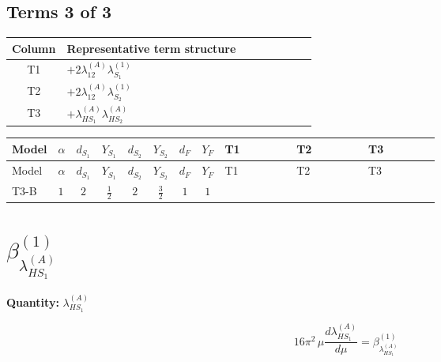 \documentclass[8pt]{article}
\begin{document}
\begin{landscape}
\subsection*{Terms 3 of 3}
\begin{center}
\begin{tabular}{@{}c >{\raggedright\arraybackslash}p{0.82\linewidth}@{}}
\toprule
Column & Representative term structure \\
\midrule
T1 & \(\displaystyle +2 {\lambda_{12}^{(A)}} {\lambda_{S_1}^{(1)}}\) \\
\midrule
T2 & \(\displaystyle +2 {\lambda_{12}^{(A)}} {\lambda_{S_2}^{(1)}}\) \\
\midrule
T3 & \(\displaystyle +{\lambda_{HS_1}^{(A)}} {\lambda_{HS_2}^{(A)}}\) \\
\midrule
\bottomrule
\end{tabular}
\end{center}
\smallskip
\tiny
\begin{longtable}{@{}llcccccc >{\raggedright\arraybackslash}p{0.21\linewidth} >{\raggedright\arraybackslash}p{0.21\linewidth} >{\raggedright\arraybackslash}p{0.21\linewidth}@{}}
\toprule
Model & $\alpha$ & $d_{S_1}$ & $Y_{S_1}$ & $d_{S_2}$ & $Y_{S_2}$ & $d_F$ & $Y_F$ & T1 & T2 & T3 \\
\midrule
\endfirsthead
\toprule
Model & $\alpha$ & $d_{S_1}$ & $Y_{S_1}$ & $d_{S_2}$ & $Y_{S_2}$ & $d_F$ & $Y_F$ & T1 & T2 & T3 \\
\midrule
\endhead
T3-B & $1$ & $2$ & $\frac{1}{2}$ & $2$ & $\frac{3}{2}$ & $1$ & $1$ & \scriptsize\adjustbox{max width=\linewidth}{$\begin{gathered} +2 {\lambda_{12}^{(A)}} {\lambda_{S_1}^{(1)}}\end{gathered}$} & \scriptsize\adjustbox{max width=\linewidth}{$\begin{gathered} +2 {\lambda_{12}^{(A)}} {\lambda_{S_2}^{(1)}}\end{gathered}$} & \scriptsize\adjustbox{max width=\linewidth}{$\begin{gathered} +{\lambda_{HS_1}^{(A)}} {\lambda_{HS_2}^{(A)}}\end{gathered}$} \\
\midrule
\bottomrule
\end{longtable}
\clearpage
\section*{$\beta_{\lambda_{HS_1}^{(A)}}^{(1)}$}
\noindent\textbf{Quantity: }$\lambda_{HS_1}^{(A)}$\par\smallskip
\[16\pi^2\,\mu\frac{d \lambda_{HS_1}^{(A)}}{d\mu}=\beta_{\lambda_{HS_1}^{(A)}}^{(1)}\]

\end{landscape}
\end{document}

